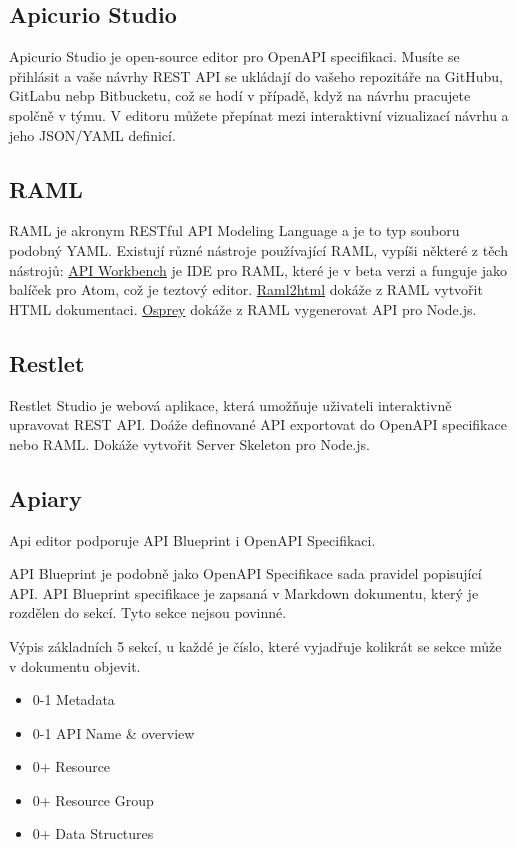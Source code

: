 \documentclass[thesis=B,czech]{FITthesis}[2012/06/26]
\begin{document}
        \subsection{Apicurio Studio}
            Apicurio Studio je open-source editor pro OpenAPI specifikaci. Musíte se přihlásit a vaše návrhy REST API se ukládají do vašeho repozitáře na GitHubu, GitLabu nebp Bitbucketu, což se hodí v případě, když na návrhu pracujete spolčně v týmu. V editoru můžete přepínat mezi interaktivní vizualizací návrhu a jeho JSON/YAML definicí.
        \subsection{RAML}
            RAML je akronym RESTful API Modeling Language a je to typ souboru podobný YAML. Existují různé nástroje používající RAML, vypíši některé z těch nástrojů:
            \href{http://apiworkbench.com}{API Workbench} je IDE pro RAML, které je v beta verzi a funguje jako balíček pro Atom, což je teztový editor.
            \href{https://github.com/raml2html/raml2html}{Raml2html} dokáže z RAML vytvořit  HTML dokumentaci.
            \href{https://github.com/mulesoft/osprey}{Osprey} dokáže z RAML vygenerovat API pro Node.js.
        \subsection{Restlet}
            Restlet Studio je webová aplikace, která umožňuje uživateli interaktivně upravovat REST API. Doáže definované API exportovat do OpenAPI specifikace nebo RAML. Dokáže vytvořit  Server Skeleton pro Node.js.
        \subsection{Apiary}
            Api editor podporuje API Blueprint i OpenAPI Specifikaci.
            
            API Blueprint je podobně jako OpenAPI Specifikace sada pravidel popisující API. API Blueprint specifikace je zapsaná v Markdown dokumentu, který je rozdělen do sekcí. Tyto sekce nejsou povinné.
            
            Výpis základních 5 sekcí, u každé je číslo, které vyjadřuje kolikrát se sekce může v dokumentu objevit.
            \begin{itemize} %
                \item 0-1 Metadata
                \item 0-1 API Name \& overview
                \item 0+ Resource
                \item 0+ Resource Group
                \item 0+ Data Structures
            \end{itemize}
            
\end{document}
